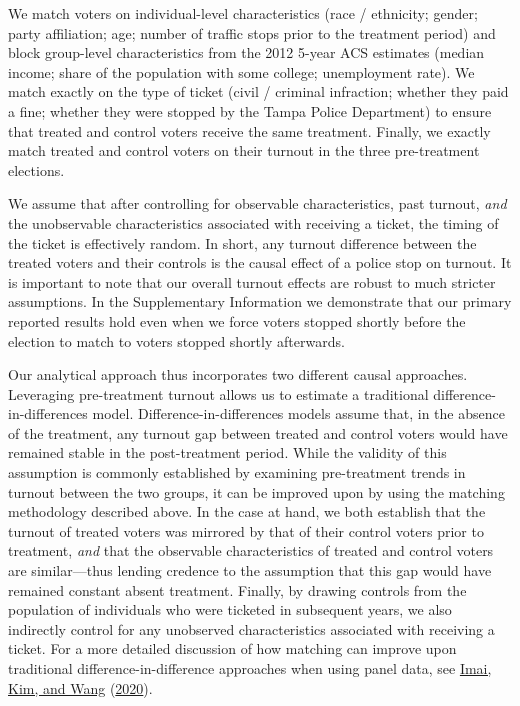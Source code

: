 \documentclass[
  12pt,
]{article}
\begin{document}
We match voters on individual-level characteristics (race / ethnicity; gender; party affiliation; age; number of traffic stops prior to the treatment period) and block group-level characteristics from the 2012 5-year ACS estimates (median income; share of the population with some college; unemployment rate). We match exactly on the type of ticket (civil / criminal infraction; whether they paid a fine; whether they were stopped by the Tampa Police Department) to ensure that treated and control voters receive the same treatment. Finally, we exactly match treated and control voters on their turnout in the three pre-treatment elections.

We assume that after controlling for observable characteristics, past turnout, \emph{and} the unobservable characteristics associated with receiving a ticket, the timing of the ticket is effectively random. In short, any turnout difference between the treated voters and their controls is the causal effect of a police stop on turnout. It is important to note that our overall turnout effects are robust to much stricter assumptions. In the Supplementary Information we demonstrate that our primary reported results hold even when we force voters stopped shortly before the election to match to voters stopped shortly afterwards.

Our analytical approach thus incorporates two different causal approaches. Leveraging pre-treatment turnout allows us to estimate a traditional difference-in-differences model. Difference-in-differences models assume that, in the absence of the treatment, any turnout gap between treated and control voters would have remained stable in the post-treatment period. While the validity of this assumption is commonly established by examining pre-treatment trends in turnout between the two groups, it can be improved upon by using the matching methodology described above. In the case at hand, we both establish that the turnout of treated voters was mirrored by that of their control voters prior to treatment, \emph{and} that the observable characteristics of treated and control voters are similar---thus lending credence to the assumption that this gap would have remained constant absent treatment. Finally, by drawing controls from the population of individuals who were ticketed in subsequent years, we also indirectly control for any unobserved characteristics associated with receiving a ticket. For a more detailed discussion of how matching can improve upon traditional difference-in-difference approaches when using panel data, see \protect\hyperlink{ref-Imai2020}{Imai, Kim, and Wang} (\protect\hyperlink{ref-Imai2020}{2020}).
\end{document}
